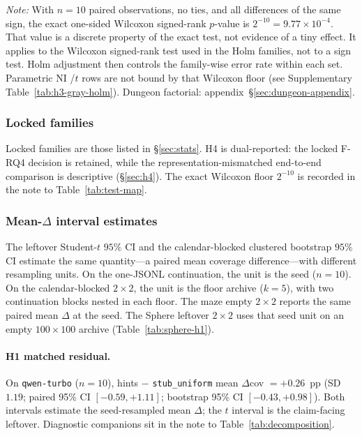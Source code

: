 \documentclass[preprint,12pt]{elsarticle}
\begin{document}
\begin{table}[!htbp]
\begin{tabularx}{\linewidth}{@{}>{\raggedright\arraybackslash}p{2.15cm}>{\raggedright\arraybackslash}p{2.45cm}>{\raggedright\arraybackslash}p{2.45cm}>{\raggedright\arraybackslash}X>{\raggedright\arraybackslash}p{1.85cm}@{}}
    \bottomrule
  \end{tabularx}
  \vspace{0.25em}
  \noindent\textit{Note:} With $n{=}10$ paired observations, no ties, and all differences of the same sign, the exact one-sided Wilcoxon signed-rank $p$-value is $2^{-10}{=}9.77\times10^{-4}$. That value is a discrete property of the exact test, not evidence of a tiny effect. It applies to the Wilcoxon signed-rank test used in the Holm families, not to a sign test. Holm adjustment then controls the family-wise error rate within each set. Parametric NI /$t$ rows are not bound by that Wilcoxon floor (see Supplementary Table~\ref{tab:h3-gray-holm}). Dungeon factorial: appendix~\S\ref{sec:dungeon-appendix}.
\end{table}

\subsubsection*{Locked families}

Locked families are those listed in \S\ref{sec:stats}. H4 is dual-reported: the locked F-RQ4 decision is retained, while the representation-mismatched end-to-end comparison is descriptive (\S\ref{sec:h4}). The exact Wilcoxon floor $2^{-10}$ is recorded in the note to Table~\ref{tab:test-map}.

\subsubsection*{Mean-$\Delta$ interval estimates}

The leftover Student-$t$ $95\%$ CI and the calendar-blocked clustered bootstrap $95\%$ CI estimate the same quantity---a paired mean coverage difference---with different resampling units. On the one-JSONL continuation, the unit is the seed ($n{=}10$). On the calendar-blocked $2\times2$, the unit is the floor archive ($k{=}5$), with two continuation blocks nested in each floor. The maze empty $2\times2$ reports the same paired mean $\Delta$ at the seed. The Sphere leftover $2\times2$ uses that seed unit on an empty $100\times100$ archive (Table~\ref{tab:sphere-h1}).

\paragraph{H1 matched residual.}
On \texttt{qwen-turbo} ($n{=}10$), hints $-$ \texttt{stub\_uniform} mean $\Delta$cov $=+0.26$~pp (SD~$1.19$; paired 95\% CI $[-0.59,+1.11]$; bootstrap 95\% CI $[-0.43,+0.98]$). Both intervals estimate the seed-resampled mean $\Delta$; the $t$ interval is the claim-facing leftover. Diagnostic companions sit in the note to Table~\ref{tab:decomposition}.
\end{document}

